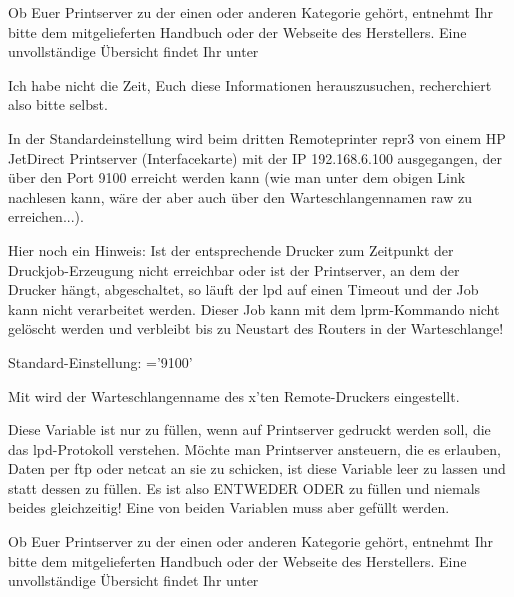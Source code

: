 \begin{description}
    Ob Euer Printserver zu der einen oder anderen Kategorie gehört, entnehmt Ihr
    bitte dem mitgelieferten Handbuch oder der Webseite des Herstellers.
    Eine unvollständige Übersicht findet Ihr unter


    Ich habe nicht die Zeit, Euch diese Informationen herauszusuchen,
    recherchiert also bitte selbst.

    In der Standardeinstellung wird beim dritten Remoteprinter repr3 von einem
    HP JetDirect Printserver (Interfacekarte) mit der IP 192.168.6.100
    ausgegangen, der über den Port 9100 erreicht werden kann (wie man unter dem
    obigen Link nachlesen kann, wäre der aber auch über den Warteschlangennamen
    raw zu erreichen...).

    Hier noch ein Hinweis:
    Ist der entsprechende Drucker zum Zeitpunkt der Druckjob-Erzeugung nicht
    erreichbar oder ist der Printserver, an dem der Drucker hängt, abgeschaltet,
    so läuft der lpd auf einen Timeout und der Job kann nicht verarbeitet
    werden. Dieser Job kann mit dem lprm-Kommando nicht gelöscht werden und
    verbleibt bis zu Neustart des Routers in der Warteschlange!

    Standard-Einstellung: ='9100'



    Mit  wird der Warteschlangenname des x'ten
    Remote-Druckers eingestellt.

    Diese Variable ist nur zu füllen, wenn auf Printserver gedruckt werden soll,
    die das lpd-Protokoll verstehen.
    Möchte man Printserver ansteuern, die es erlauben, Daten per ftp oder netcat
    an sie zu schicken, ist diese Variable leer zu lassen und statt dessen
     zu füllen.
    Es ist also ENTWEDER  ODER
     zu füllen und niemals
    beides gleichzeitig! Eine von beiden Variablen muss aber gefüllt werden.

    Ob Euer Printserver zu der einen oder anderen Kategorie gehört, entnehmt Ihr
    bitte dem mitgelieferten Handbuch oder der Webseite des Herstellers.
    Eine unvollständige Übersicht findet Ihr unter



\end{description}
